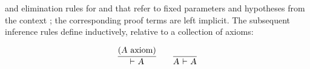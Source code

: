 \begin{isabellebody}
\begin{isamarkuptext}
  and elimination rules for  and  that refer to
  fixed parameters  and hypotheses
   from the context ;
  the corresponding proof terms are left implicit.  The subsequent
  inference rules define  inductively, relative to a
  collection of axioms:

  \[
  \infer{\isa{{\isaliteral{22}{\isachardoublequote}}{\isaliteral{5C3C7475726E7374696C653E}{\isasymturnstile}}\ A{\isaliteral{22}{\isachardoublequote}}}}{(\isa{{\isaliteral{22}{\isachardoublequote}}A{\isaliteral{22}{\isachardoublequote}}} \text{~axiom})}
  \qquad
  \infer{\isa{{\isaliteral{22}{\isachardoublequote}}A\ {\isaliteral{5C3C7475726E7374696C653E}{\isasymturnstile}}\ A{\isaliteral{22}{\isachardoublequote}}}}{}
  \]


\end{isamarkuptext}
\end{isabellebody}
